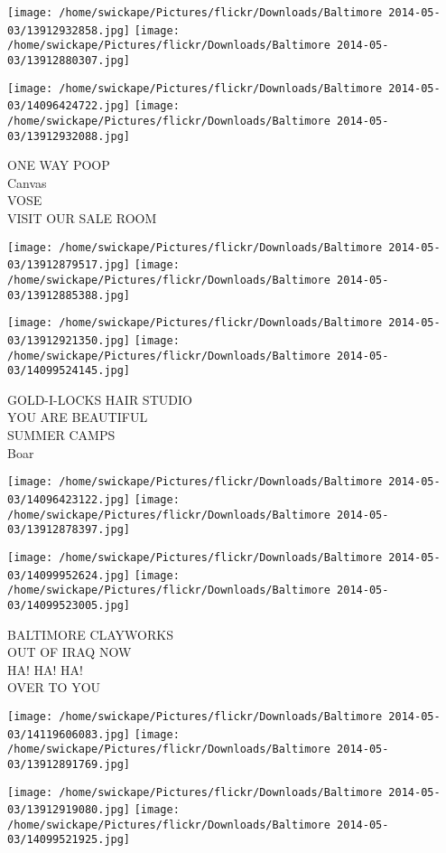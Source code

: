 \documentclass[10pt,letterpaper]{article}
\begin{document}
\texttt{[image: /home/swickape/Pictures/flickr/Downloads/Baltimore 2014-05-03/13912932858.jpg]}
\texttt{[image: /home/swickape/Pictures/flickr/Downloads/Baltimore 2014-05-03/13912880307.jpg]}

\texttt{[image: /home/swickape/Pictures/flickr/Downloads/Baltimore 2014-05-03/14096424722.jpg]}
\texttt{[image: /home/swickape/Pictures/flickr/Downloads/Baltimore 2014-05-03/13912932088.jpg]}

ONE WAY POOP\\
Canvas\\
VOSE\\
VISIT OUR SALE ROOM
\pagebreak

\texttt{[image: /home/swickape/Pictures/flickr/Downloads/Baltimore 2014-05-03/13912879517.jpg]}
\texttt{[image: /home/swickape/Pictures/flickr/Downloads/Baltimore 2014-05-03/13912885388.jpg]}

\texttt{[image: /home/swickape/Pictures/flickr/Downloads/Baltimore 2014-05-03/13912921350.jpg]}
\texttt{[image: /home/swickape/Pictures/flickr/Downloads/Baltimore 2014-05-03/14099524145.jpg]}

GOLD{-}I{-}LOCKS HAIR STUDIO\\
YOU ARE BEAUTIFUL\\
SUMMER CAMPS\\
Boar
\pagebreak

\texttt{[image: /home/swickape/Pictures/flickr/Downloads/Baltimore 2014-05-03/14096423122.jpg]}
\texttt{[image: /home/swickape/Pictures/flickr/Downloads/Baltimore 2014-05-03/13912878397.jpg]}

\texttt{[image: /home/swickape/Pictures/flickr/Downloads/Baltimore 2014-05-03/14099952624.jpg]}
\texttt{[image: /home/swickape/Pictures/flickr/Downloads/Baltimore 2014-05-03/14099523005.jpg]}

BALTIMORE CLAYWORKS\\
OUT OF IRAQ NOW\\
HA! HA! HA!\\
OVER TO YOU
\pagebreak

\texttt{[image: /home/swickape/Pictures/flickr/Downloads/Baltimore 2014-05-03/14119606083.jpg]}
\texttt{[image: /home/swickape/Pictures/flickr/Downloads/Baltimore 2014-05-03/13912891769.jpg]}

\texttt{[image: /home/swickape/Pictures/flickr/Downloads/Baltimore 2014-05-03/13912919080.jpg]}
\texttt{[image: /home/swickape/Pictures/flickr/Downloads/Baltimore 2014-05-03/14099521925.jpg]}
\end{document}
